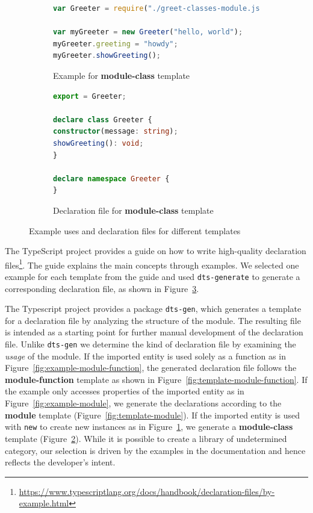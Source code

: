 \documentclass[sigplan,screen]{acmart}
\newcommand{\figref}[1]{Figure~\ref{#1}}
\begin{document}
\begin{figure}[t]
  \begin{subfigure}[t]{0.48\linewidth}
    \begin{lstlisting}[language=JavaScript,numbers=none]
var Greeter = require("./greet-classes-module.js");

var myGreeter = new Greeter("hello, world");
myGreeter.greeting = "howdy";
myGreeter.showGreeting();
    \end{lstlisting}
    \caption{Example for \textbf{module-class} template}
    \label{fig:example-class}
  \end{subfigure}
  \hfill
  \begin{subfigure}[t]{0.48\linewidth}
    \begin{lstlisting}[language=TypeScript,numbers=none]
export = Greeter;

declare class Greeter {
constructor(message: string);
showGreeting(): void;
}

declare namespace Greeter {
}
    \end{lstlisting}
    \caption{Declaration file for \textbf{module-class} template}
    \label{fig:template-class}
  \end{subfigure}

\caption{Example uses and declaration files for different templates}
\label{fig:typescript-templates-by-example}
\end{figure}

The TypeScript project provides a guide on how to write high-quality declaration
files\footnote{\url{https://www.typescriptlang.org/docs/handbook/declaration-files/by-example.html}}. The guide
explains the main concepts through examples. We selected one example for each template
from the guide and
used \texttt{dts-generate} to generate a corresponding declaration file, as shown in
\figref{fig:typescript-templates-by-example}.

The Typescript project provides a package \texttt{dts-gen}, which
generates a template for a declaration file by analyzing the structure
of the module. The resulting file is intended as a starting point for further
manual development of the declaration file. 
Unlike \texttt{dts-gen} we determine the kind of declaration file by
examining the \emph{usage} of the module. If the imported entity is
used solely as a function as in
Figure~\ref{fig:example-module-function}, the 
generated declaration file follows the \textbf{module-function}
template as shown in Figure~\ref{fig:template-module-function}. 
If the example only accesses properties of the imported entity as in
Figure~\ref{fig:example-module}, we generate the declarations
according to the \textbf{module} template
(Figure~\ref{fig:template-module}). 
If the imported entity is used with \lstinline/new/ to create new instances as in
Figure~\ref{fig:example-class}, we generate a \textbf{module-class} template (Figure~\ref{fig:template-class}).
While it is possible to create a library of undetermined category, our selection is driven
by the examples in the documentation and 
hence reflects the developer's intent.
\end{document}

